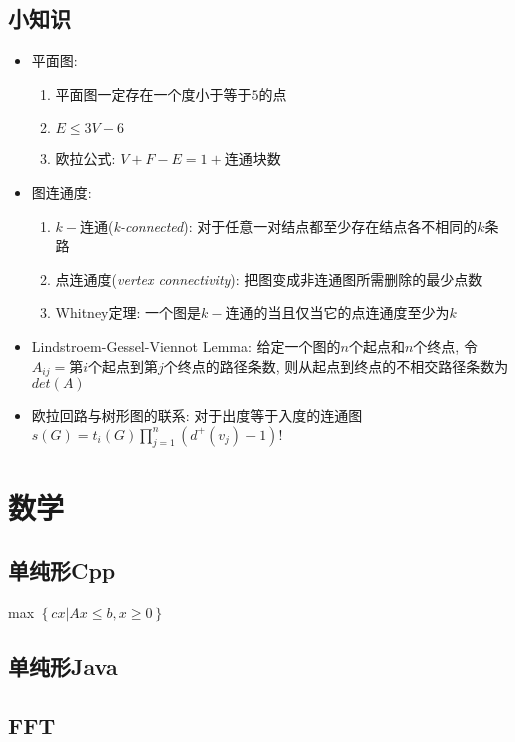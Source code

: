 \documentclass[landscape, twocolumn, 8pt, a4paper, twoside]{extarticle}
\begin{document}
  \subsection{小知识}
  \begin{itemize}
  \item 平面图: 
    \begin{enumerate}
    \item 平面图一定存在一个度小于等于$5$的点
    \item $E \le 3V - 6$
    \item 欧拉公式: $V + F - E = 1 + \mbox{连通块数}$
    \end{enumerate}
  \item 图连通度: 
    \begin{enumerate}
    \item $k-$连通(\emph{k-connected}): 对于任意一对结点都至少存在结点各不相同的$k$条路
    \item 点连通度(\emph{vertex connectivity}): 把图变成非连通图所需删除的最少点数
    \item Whitney定理: 一个图是$k-$连通的当且仅当它的点连通度至少为$k$
    \end{enumerate}
  \item Lindstroem-Gessel-Viennot Lemma:
    给定一个图的$n$个起点和$n$个终点, 
    令$A_{ij} = $第$i$个起点到第$j$个终点的路径条数,
    则从起点到终点的不相交路径条数为 $det(A)$
  \item 欧拉回路与树形图的联系: 
    对于出度等于入度的连通图
    $s(G) = t_i(G) \prod_{j = 1}^{n} (d^+(v_j) - 1)! $
  \end{itemize}

\section{数学}
  \subsection{单纯形Cpp}
    max $\left \{ cx | Ax \le b, x \ge 0 \right \}$
    
  \subsection{单纯形Java}
    

  \subsection{FFT}
    
\end{document}

